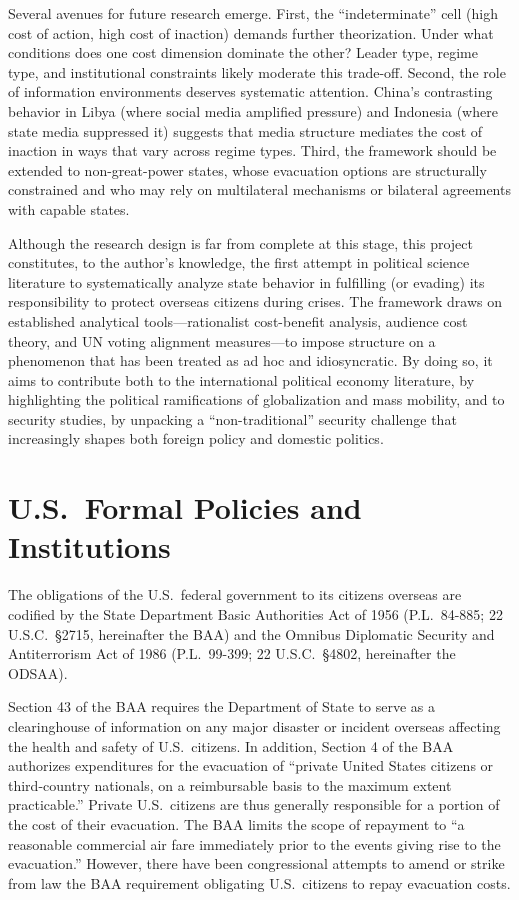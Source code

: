 \documentclass[12pt]{article}
\begin{document}
Several avenues for future research emerge. First, the ``indeterminate'' cell (high cost of action, high cost of inaction) demands further theorization. Under what conditions does one cost dimension dominate the other? Leader type, regime type, and institutional constraints likely moderate this trade-off. Second, the role of information environments deserves systematic attention. China's contrasting behavior in Libya (where social media amplified pressure) and Indonesia (where state media suppressed it) suggests that media structure mediates the cost of inaction in ways that vary across regime types. Third, the framework should be extended to non-great-power states, whose evacuation options are structurally constrained and who may rely on multilateral mechanisms or bilateral agreements with capable states.

Although the research design is far from complete at this stage, this project constitutes, to the author's knowledge, the first attempt in political science literature to systematically analyze state behavior in fulfilling (or evading) its responsibility to protect overseas citizens during crises. The framework draws on established analytical tools---rationalist cost-benefit analysis, audience cost theory, and UN voting alignment measures---to impose structure on a phenomenon that has been treated as ad hoc and idiosyncratic. By doing so, it aims to contribute both to the international political economy literature, by highlighting the political ramifications of globalization and mass mobility, and to security studies, by unpacking a ``non-traditional'' security challenge that increasingly shapes both foreign policy and domestic politics.

\appendix
\section{U.S.\ Formal Policies and Institutions}

The obligations of the U.S.\ federal government to its citizens overseas are codified by the State Department Basic Authorities Act of 1956 (P.L.\ 84-885; 22 U.S.C.\ \S2715, hereinafter the BAA) and the Omnibus Diplomatic Security and Antiterrorism Act of 1986 (P.L.\ 99-399; 22 U.S.C.\ \S4802, hereinafter the ODSAA).

Section 43 of the BAA requires the Department of State to serve as a clearinghouse of information on any major disaster or incident overseas affecting the health and safety of U.S.\ citizens. In addition, Section 4 of the BAA authorizes expenditures for the evacuation of ``private United States citizens or third-country nationals, on a reimbursable basis to the maximum extent practicable.'' Private U.S.\ citizens are thus generally responsible for a portion of the cost of their evacuation. The BAA limits the scope of repayment to ``a reasonable commercial air fare immediately prior to the events giving rise to the evacuation.'' However, there have been congressional attempts to amend or strike from law the BAA requirement obligating U.S.\ citizens to repay evacuation costs.
\end{document}
